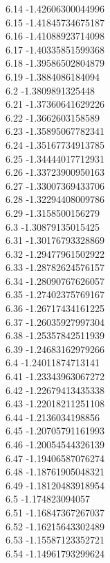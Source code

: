 {6.14	-1.42606300044996\\
6.15	-1.41845734675187\\
6.16	-1.41088923714098\\
6.17	-1.40335851599368\\
6.18	-1.39586502804879\\
6.19	-1.3884086184094\\
6.2	-1.3809891325448\\
6.21	-1.37360641629226\\
6.22	-1.3662603158589\\
6.23	-1.35895067782341\\
6.24	-1.35167734913785\\
6.25	-1.34444017712931\\
6.26	-1.33723900950163\\
6.27	-1.33007369433706\\
6.28	-1.32294408009786\\
6.29	-1.3158500156279\\
6.3	-1.30879135015425\\
6.31	-1.30176793328869\\
6.32	-1.29477961502922\\
6.33	-1.28782624576157\\
6.34	-1.28090767626057\\
6.35	-1.27402375769167\\
6.36	-1.26717434161225\\
6.37	-1.26035927997304\\
6.38	-1.25357842511939\\
6.39	-1.24683162979266\\
6.4	-1.24011874713141\\
6.41	-1.23343963067272\\
6.42	-1.22679413435338\\
6.43	-1.22018211251108\\
6.44	-1.2136034198856\\
6.45	-1.20705791161993\\
6.46	-1.20054544326139\\
6.47	-1.19406587076274\\
6.48	-1.18761905048321\\
6.49	-1.18120483918954\\
6.5	-1.174823094057\\
6.51	-1.16847367267037\\
6.52	-1.16215643302489\\
6.53	-1.15587123352721\\
6.54	-1.14961793299624\\
}
